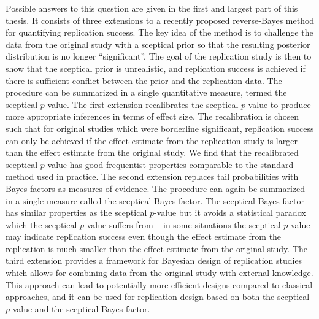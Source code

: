 Possible answers to this question are given in the first and largest part of
this thesis. It consists of three extensions to a recently proposed
reverse-Bayes method for quantifying replication success. The key idea of the
method is to challenge the data from the original study with a sceptical prior
so that the resulting posterior distribution is no longer ``significant''. The
goal of the replication study is then to show that the sceptical prior is
unrealistic, and replication success is achieved if there is sufficient conflict
between the prior and the replication data. The procedure can be summarized in a
single quantitative measure, termed the sceptical $p$-value.
The first extension recalibrates the sceptical $p$-value to produce more
appropriate inferences in terms of effect size. The recalibration is chosen such
that for original studies which were borderline significant, replication success
can only be achieved if the effect estimate from the replication study is larger
than the effect estimate from the original study. We find that the recalibrated
sceptical $p$-value has good frequentist properties comparable to the standard
method used in practice.
The second extension replaces tail probabilities with Bayes factors as measures
of evidence. The procedure can again be summarized in a single measure called
the sceptical Bayes factor.
The sceptical Bayes factor has similar properties as the sceptical $p$-value but
it avoids a statistical paradox which the sceptical $p$-value suffers from -- in
some situations the sceptical $p$-value may indicate replication success even
though the effect estimate from the replication is much smaller than the effect
estimate from the original study. %
The third extension provides a framework for Bayesian design of replication
studies which allows for combining data from the original study with external
knowledge. This approach can lead to potentially more efficient designs compared
to classical approaches, and it can be used for replication design based on both
the sceptical $p$-value and the sceptical Bayes factor.

